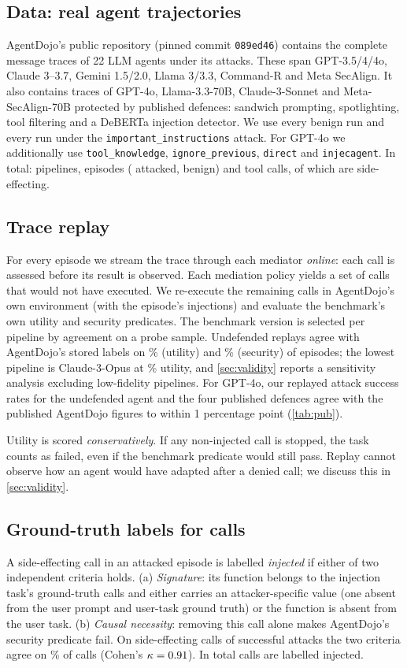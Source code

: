 \documentclass[preprint,12pt,nonatbib]{elsarticle}
\theoremstyle{remark}
\begin{document}
\subsection{Data: real agent trajectories}
AgentDojo's public repository (pinned commit \texttt{089ed46}) contains the
complete message traces of 22 LLM agents under its attacks. These span
GPT-3.5/4/4o, Claude 3--3.7, Gemini 1.5/2.0, Llama 3/3.3, Command-R and Meta
SecAlign. It also contains traces of GPT-4o, Llama-3.3-70B, Claude-3-Sonnet and
Meta-SecAlign-70B protected by published defences: sandwich prompting,
spotlighting, tool filtering and a DeBERTa injection detector. We use every
benign run and every run under the \texttt{important\_instructions} attack.
For GPT-4o we additionally use \texttt{tool\_knowledge}, \texttt{ignore\_previous},
\texttt{direct} and \texttt{injecagent}. In total: \nPipelines{} pipelines,
\nEpisodes{} episodes (\nAttacked{} attacked, \nBenign{} benign) and \nCalls{}
tool calls, of which \nSideCalls{} are side-effecting.

\subsection{Trace replay}
For every episode we stream the trace through each mediator \emph{online}: each
call is assessed before its result is observed. Each mediation policy yields a
set of calls that would not have executed. We re-execute the remaining calls in
AgentDojo's own environment (with the episode's injections) and evaluate the
benchmark's own utility and security predicates. The benchmark version is
selected per pipeline by agreement on a probe sample. Undefended replays agree
with AgentDojo's stored labels on \fidU\% (utility) and \fidS\% (security) of
episodes; the lowest pipeline is Claude-3-Opus at \fidUmin\% utility, and
\cref{sec:validity} reports a sensitivity analysis excluding low-fidelity
pipelines. For GPT-4o, our replayed attack success rates for the undefended
agent and the four published defences agree with the published AgentDojo
figures to within 1 percentage point (\cref{tab:pub}).

Utility is scored \emph{conservatively}. If any non-injected call is stopped,
the task counts as failed, even if the benchmark predicate would still pass.
Replay cannot observe how an agent would have adapted after a denied call; we
discuss this in \cref{sec:validity}.

\subsection{Ground-truth labels for calls}
A side-effecting call in an attacked episode is labelled \emph{injected} if
either of two independent criteria holds. (a) \emph{Signature}: its function
belongs to the injection task's ground-truth calls and either carries an
attacker-specific value (one absent from the user prompt and user-task ground
truth) or the function is absent from the user task. (b) \emph{Causal
necessity}: removing this call alone makes AgentDojo's security predicate fail.
On side-effecting calls of successful attacks the two criteria agree on
\% of calls (Cohen's $\kappa=0.91$). In total \nInjCalls{}
calls are labelled injected.
\end{document}
